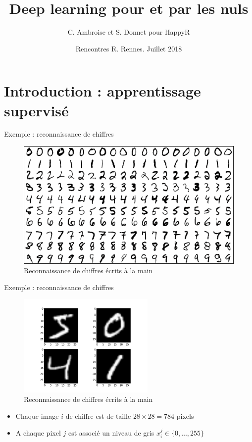 \documentclass[ignorenonframetext,]{beamer}
\title{Deep learning pour et par les nuls}
\author{C. Ambroise et S. Donnet pour HappyR}
\date{Rencontres R. Rennes. Juillet 2018}
\providecommand{\tightlist}{%
  \setlength{\itemsep}{0pt}\setlength{\parskip}{0pt}}
\begin{document}
\frame{\titlepage}

\section{Introduction : apprentissage
supervisé}\label{introduction-apprentissage-supervise}

\begin{frame}{Exemple : reconnaissance de chiffres}

\begin{figure}
\centering
\includegraphics{mnist.png}
\caption{Reconnaissance de chiffres écrits à la main}
\end{figure}

\end{frame}

\begin{frame}{Exemple : reconnaissance de chiffres}

\begin{figure}
\centering
\includegraphics[width=2.60417in]{mnist_details.png}
\caption{Reconnaissance de chiffres écrits à la main}
\end{figure}

\begin{itemize}
\tightlist
\item
  Chaque image \(i\) de chiffre est de taille \(28 \times 28 = 784\)
  pixels
\item
  A chaque pixel \(j\) est associé un niveau de gris
  \(x_i^j \in \{0,\dots, 255\}\)
\end{itemize}

\end{frame}
\end{document}
